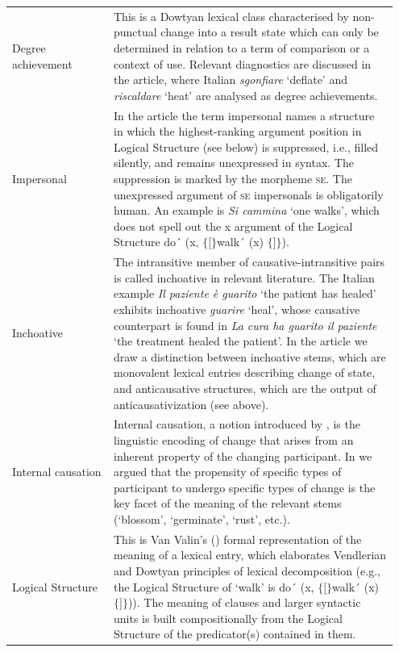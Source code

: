 \documentclass[output=paper,colorlinks,citecolor=brown
]{langscibook}
\begin{document}
\begin{table}[H]
\begin{tabular}{p{0.25\linewidth}p{0.7\linewidth}}
Degree   achievement    & This is a Dowtyan lexical class   characterised by non-punctual change into a result state which can only be   determined in relation to a term of comparison or a context of use. Relevant   diagnostics are discussed in the article, where Italian \textit{sgonfiare}   ‘deflate’ and \textit{riscaldare} ‘heat’ are analysed as degree achievements.                 \\
Impersonal              & In the article the term impersonal   names a structure in which the highest-ranking argument position in Logical   Structure (see below) is suppressed, i.e., filled silently, and remains   unexpressed in syntax. The suppression is marked by the morpheme \textsc{se}. The unexpressed argument of \textsc{se} impersonals is obligatorily human.  An example is \textit{Si cammina} ‘one   walks’, which does not spell out the x argument of the Logical Structure do´ (x, $\{ [ \}$walk´ (x) $\{ ] \}$).                    \\
Inchoative              & The intransitive member of   causative-intransitive pairs is called inchoative in relevant   literature. The Italian example \textit{Il paziente è guarito} ‘the patient has   healed’ exhibits inchoative \textit{guarire} ‘heal’, whose causative   counterpart is found in \textit{La cura ha guarito il paziente} ‘the treatment   healed the patient’. In the article we draw a distinction between inchoative stems,   which are monovalent lexical entries describing change of state, and anticausative   structures, which are the output of anticausativization (see above).     \\
Internal   causation    & Internal causation, a notion introduced   by \citet{levin1995unaccusativity}, is the linguistic encoding of change   that arises from an inherent property of the changing participant. In \citet{bentley2023internally} we argued that the propensity of specific types of participant to   undergo specific types of change is the key facet of the meaning of the   relevant stems (‘blossom’, ‘germinate’, ‘rust’, etc.).                               \\
Logical   Structure     & This is Van Valin's (\citeyear{vanvalin2005exploring,vanvalin2023principles}) formal   representation of the meaning of a lexical entry, which elaborates Vendlerian   and Dowtyan principles of lexical decomposition (e.g., the Logical Structure   of ‘walk’ is do´   (x,   $\{ [ \}$walk´ (x)$\{ ] \}$)). The meaning of clauses   and larger syntactic units is built compositionally from the Logical   Structure of the predicator(s) contained in them.                   \\

\end{tabular}
\end{table}
\end{document}
